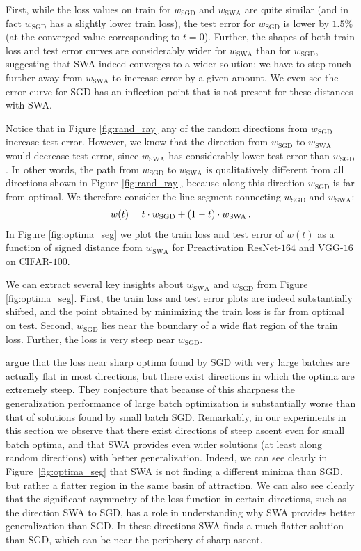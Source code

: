 \documentclass[letterpaper]{article}
\begin{document}
First, while the loss values on train for $w_{\text{SGD}}$ and $w_{\text{SWA}}$
are quite similar (and in fact $w_{\text{SGD}}$ has a slightly lower train loss),
the test error for $w_{\text{SGD}}$ is lower by $1.5 \%$ (at the converged value
corresponding to $t=0$).
Further, the shapes of both train loss and test error curves
are considerably wider for $w_{\text{SWA}}$ than for $w_{\text{SGD}}$, suggesting
that SWA indeed converges to a wider solution: we have to step much further away
from $w_{\text{SWA}}$ to increase error by a given amount. 
We even see the error curve for SGD has an inflection point that is not present for 
these distances with SWA.

Notice that in Figure \ref{fig:rand_ray} any of the random directions from $w_{\text{SGD}}$
increase test error.
However, we know that the direction from $w_{\text{SGD}}$ to $w_{\text{SWA}}$ would 
decrease test error,
since $w_{\text{SWA}}$ has considerably lower test error than $w_{\text{SGD}}$.
In other words, the path from $w_{\text{SGD}}$ to $w_{\text{SWA}}$ is qualitatively 
different from all directions shown in Figure \ref{fig:rand_ray}, because
along this direction $w_{\text{SGD}}$ is far from optimal.
We therefore consider the line segment connecting 
 $w_{\text{SGD}}$ and $w_{\text{SWA}}$:
\begin{align}
  \notag
  w(t) = t \cdot w_{\text{SGD}} + (1 - t) \cdot w_{\text{SWA}} \,.
\end{align}
In Figure \ref{fig:optima_seg} we plot the train loss
and test error of $w(t)$ as a function of signed distance from $w_{\text{SWA}}$ for 
Preactivation ResNet-$164$ and VGG-$16$ on CIFAR-$100$. 

We can extract several key insights about $w_{\text{SWA}}$ and $w_{\text{SGD}}$ from 
Figure \ref{fig:optima_seg}. First, the train loss and test error plots are 
indeed substantially shifted, and the point obtained by minimizing the train
loss is far from optimal on test. Second, $w_{\text{SGD}}$ lies near the boundary
of a wide flat region of the train loss. Further, the loss is very steep near
$w_{\text{SGD}}$. 

\citet{keskar2017large} argue that the loss near sharp optima found by SGD with very
large batches are actually flat in most directions, but there
exist directions in which the optima are extremely steep. They conjecture that
because of this sharpness the generalization performance of large batch optimization
is substantially worse than that of solutions found by small batch SGD.
Remarkably, in our experiments in this section we observe that there exist directions of steep 
ascent even for small batch optima, and that SWA provides even wider solutions 
(at least along random directions) with better generalization. Indeed, we can see clearly in 
Figure~\ref{fig:optima_seg} that SWA is not finding a different minima than SGD, but rather
a flatter region in the same basin of attraction. We can also see clearly that the significant 
asymmetry of the loss function in certain directions, such as the direction SWA to SGD, has a role in 
understanding why SWA provides better generalization than SGD. In these directions SWA
finds a much flatter solution than SGD, which can be near the periphery of sharp ascent.
\end{document}
